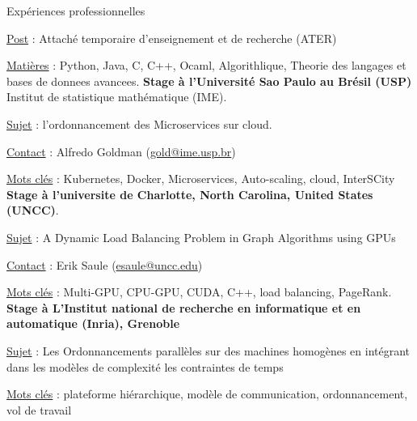 \begin{rubric}{Expériences professionnelles}
    
    \par \underline{Post} : Attaché temporaire d'enseignement et de recherche (ATER)
    \par \underline{Matières} : Python, Java, C, C++, Ocaml, Algorithlique, Theorie des langages et bases de donnees avancees. 
     \textbf{Stage à l'Université Sao Paulo au Brésil (USP)} Institut de statistique mathématique (IME).
     \hfill{} 
    \par \underline{Sujet} : l'ordonnancement des Microservices sur cloud.
    \par \underline{Contact} : Alfredo Goldman (\href{mailto:gold@ime.usp.br}{gold@ime.usp.br})
	\par \underline{Mots clés} : Kubernetes, Docker, Microservices, Auto-scaling, cloud, InterSCity
%
 \textbf{Stage à l’universite de Charlotte, North Carolina, United States (UNCC)}.
     \hfill{} 
	\par \underline{Sujet} : A Dynamic Load Balancing Problem in Graph Algorithms using GPUs
    \par \underline{Contact} : Erik Saule (\href{mailto:esaule@uncc.edu}{esaule@uncc.edu})
	\par \underline{Mots clés} : Multi-GPU, CPU-GPU, CUDA, C++, load balancing, PageRank.
%
%
    \textbf{Stage à L'Institut national de recherche en informatique et en automatique (Inria), Grenoble}
     \hfill{} 
	\par \underline{Sujet} : Les Ordonnancements parallèles sur des machines homogènes en intégrant dans les modèles de complexité les contraintes de temps
	\par \underline{Mots clés} : plateforme hiérarchique, modèle de communication, ordonnancement, vol de travail

\end{rubric}
